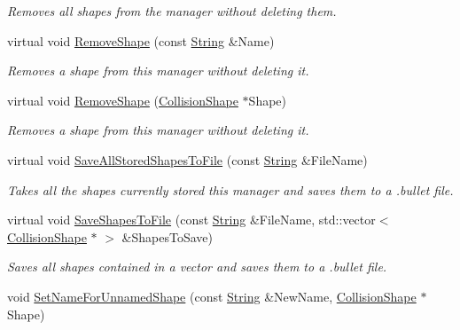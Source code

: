 \begin{DoxyCompactItemize}
\begin{DoxyCompactList}\small\item\em Removes all shapes from the manager without deleting them. \item\end{DoxyCompactList}\item 
virtual void \hyperlink{classMezzanine_1_1CollisionShapeManager_a53331ac80a2ad503c049cc212d496c94}{RemoveShape} (const \hyperlink{namespaceMezzanine_acf9fcc130e6ebf08e3d8491aebcf1c86}{String} \&Name)
\begin{DoxyCompactList}\small\item\em Removes a shape from this manager without deleting it. \item\end{DoxyCompactList}\item 
virtual void \hyperlink{classMezzanine_1_1CollisionShapeManager_a4b44e43059e853243bbe27c25be088ca}{RemoveShape} (\hyperlink{classMezzanine_1_1CollisionShape}{CollisionShape} $\ast$Shape)
\begin{DoxyCompactList}\small\item\em Removes a shape from this manager without deleting it. \item\end{DoxyCompactList}\item 
virtual void \hyperlink{classMezzanine_1_1CollisionShapeManager_a3adf0debfcef2c6ef4d2d6da1cd700f2}{SaveAllStoredShapesToFile} (const \hyperlink{namespaceMezzanine_acf9fcc130e6ebf08e3d8491aebcf1c86}{String} \&FileName)
\begin{DoxyCompactList}\small\item\em Takes all the shapes currently stored this manager and saves them to a .bullet file. \item\end{DoxyCompactList}\item 
virtual void \hyperlink{classMezzanine_1_1CollisionShapeManager_af024fba16fd19e42fb6809484005f58d}{SaveShapesToFile} (const \hyperlink{namespaceMezzanine_acf9fcc130e6ebf08e3d8491aebcf1c86}{String} \&FileName, std::vector$<$ \hyperlink{classMezzanine_1_1CollisionShape}{CollisionShape} $\ast$ $>$ \&ShapesToSave)
\begin{DoxyCompactList}\small\item\em Saves all shapes contained in a vector and saves them to a .bullet file. \item\end{DoxyCompactList}\item 
void \hyperlink{classMezzanine_1_1CollisionShapeManager_a6ee3a505210dbf09c46752d1b45bbfd0}{SetNameForUnnamedShape} (const \hyperlink{namespaceMezzanine_acf9fcc130e6ebf08e3d8491aebcf1c86}{String} \&NewName, \hyperlink{classMezzanine_1_1CollisionShape}{CollisionShape} $\ast$Shape)

\end{DoxyCompactItemize}

